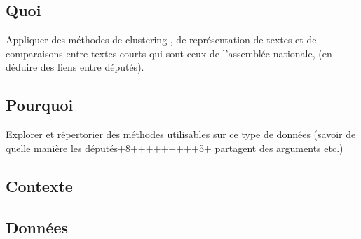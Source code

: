 \subsection{Quoi}
Appliquer des méthodes de clustering , de représentation de textes et de comparaisons entre textes courts qui sont ceux de l'assemblée nationale, (en déduire des liens entre députés). 
\subsection{Pourquoi}
Explorer et répertorier des méthodes utilisables sur ce type de données (savoir de quelle manière les députés+8+++++++++5+ partagent des arguments etc.)
\subsection{Contexte}
\subsection{Données}